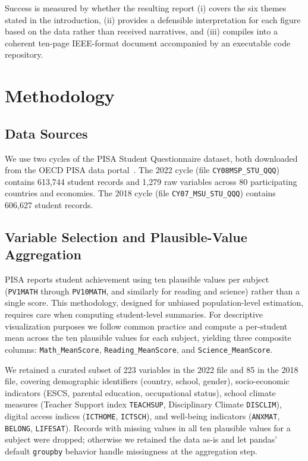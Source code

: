 \documentclass[conference]{IEEEtran}
\begin{document}
Success is measured by whether the resulting report (i) covers the six themes stated in the introduction, (ii) provides a defensible interpretation for each figure based on the data rather than received narratives, and (iii) compiles into a coherent ten-page IEEE-format document accompanied by an executable code repository.

\section{Methodology}
\label{sec:method}

\subsection{Data Sources}

We use two cycles of the PISA Student Questionnaire dataset, both downloaded from the OECD PISA data portal~\cite{oecd_pisa_2022, oecd_pisa_2018}. The 2022 cycle (file \texttt{CY08MSP\_STU\_QQQ}) contains 613{,}744 student records and 1{,}279 raw variables across 80 participating countries and economies. The 2018 cycle (file \texttt{CY07\_MSU\_STU\_QQQ}) contains 606{,}627 student records.

\subsection{Variable Selection and Plausible-Value Aggregation}

PISA reports student achievement using ten plausible values per subject (\texttt{PV1MATH} through \texttt{PV10MATH}, and similarly for reading and science) rather than a single score. This methodology, designed for unbiased population-level estimation, requires care when computing student-level summaries. For descriptive visualization purposes we follow common practice and compute a per-student mean across the ten plausible values for each subject, yielding three composite columns: \texttt{Math\_MeanScore}, \texttt{Reading\_MeanScore}, and \texttt{Science\_MeanScore}.

We retained a curated subset of 223 variables in the 2022 file and 85 in the 2018 file, covering demographic identifiers (country, school, gender), socio-economic indicators (ESCS, parental education, occupational status), school climate measures (Teacher Support index \texttt{TEACHSUP}, Disciplinary Climate \texttt{DISCLIM}), digital access indices (\texttt{ICTHOME}, \texttt{ICTSCH}), and well-being indicators (\texttt{ANXMAT}, \texttt{BELONG}, \texttt{LIFESAT}). Records with missing values in all ten plausible values for a subject were dropped; otherwise we retained the data as-is and let pandas' default \texttt{groupby} behavior handle missingness at the aggregation step.
\end{document}
